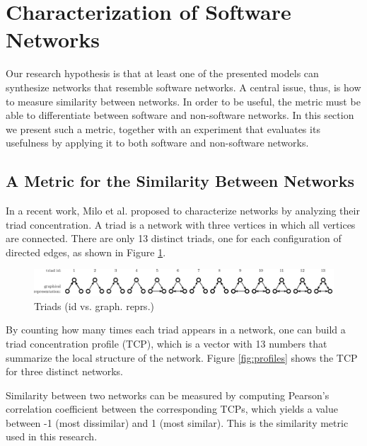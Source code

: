 
\section{Characterization of Software Networks}

Our research hypothesis is that at least one of the presented models can
synthesize networks that resemble software networks. A central issue, thus, is
how to measure similarity between networks. In order to be useful, the metric
must be able to differentiate between software and non-software networks. In
this section we present such a metric, together with an experiment that
evaluates its usefulness by applying it to both software and non-software
networks. %

\subsection{A Metric for the Similarity Between Networks}

In a recent work, Milo et al. \cite{Milo2002} proposed to characterize networks
by analyzing their triad concentration. A triad is a network with three vertices
in which all vertices are connected. There are only 13 distinct triads, one for
each configuration of directed edges, as shown in Figure \ref{fig:triads}.

\begin{figure}[!t]
\centering
\includegraphics[width=1.0\textwidth]{triads}
\caption{Triads (id vs. graph. reprs.)}
\label{fig:triads}
\end{figure}

By counting how many times each triad appears in a network, one can build a
triad concentration profile (TCP), which is a vector with 13 numbers that
summarize the local structure of the network. Figure \ref{fig:profiles} shows
the TCP for three distinct networks.

Similarity between two networks can be measured by computing Pearson's
correlation coefficient between the corresponding TCPs, which yields a value
between -1 (most dissimilar) and 1 (most similar). This is the similarity metric
used in this research.

